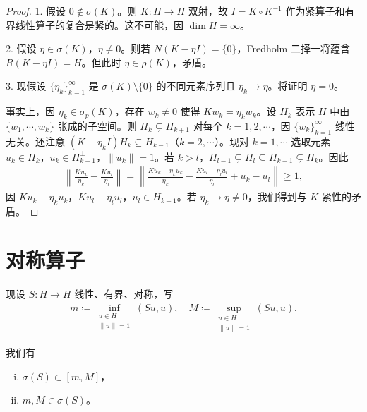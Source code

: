 \documentclass[../main.tex]{subfiles}
\begin{document}
\begin{proof}
1. 假设 $0\notin\sigma(K)$。则 $K:H\to H$ 双射，故 $I=K\circ K^{-1}$ 作为紧算子和有界线性算子的复合是紧的。这不可能，因 $\dim H=\infty$。

2. 假设 $\eta\in\sigma(K)$，$\eta\neq 0$。则若 $N(K-\eta I)=\{0\}$，Fredholm 二择一将蕴含 $R(K-\eta I)=H$。但此时 $\eta\in\rho(K)$，矛盾。

3. 现假设 $\{\eta_k\}_{k=1}^\infty$ 是 $\sigma(K)\setminus\{0\}$ 的不同元素序列且 $\eta_k\to\eta$。将证明 $\eta=0$。

事实上，因 $\eta_k\in\sigma_p(K)$，存在 $w_k\neq 0$ 使得 $Kw_k=\eta_kw_k$。设 $H_k$ 表示 $H$ 中由 $\{w_1,\cdots,w_k\}$ 张成的子空间。则 $H_k\subsetneq H_{k+1}$ 对每个 $k=1,2,\cdots$，因 $\{w_k\}_{k=1}^\infty$ 线性无关。还注意 $(K-\eta_kI)H_k\subseteq H_{k-1}$（$k=2,\cdots$）。现对 $k=1,\cdots$ 选取元素 $u_k\in H_k$，$u_k\in H_{k-1}^\perp$，$\|u_k\|=1$。若 $k>l$，$H_{l-1}\subsetneq H_l\subseteq H_{k-1}\subsetneq H_k$。因此
\begin{align*}
\left\|\frac{Ku_k}{\eta_k}-\frac{Ku_l}{\eta_l}\right\|=\left\|\frac{Ku_k-\eta_ku_k}{\eta_k}-\frac{Ku_l-\eta_lu_l}{\eta_l}+u_k-u_l\right\|\geqslant 1,
\end{align*}
因 $Ku_k-\eta_ku_k$，$Ku_l-\eta_lu_l$，$u_l\in H_{k-1}$。若 $\eta_k\to\eta\neq 0$，我们得到与 $K$ 紧性的矛盾。
\end{proof}

\section{对称算子}\label{section:appD-对称算子}

现设 $S:H\to H$ 线性、有界、对称，写
\begin{align*}
m\coloneqq\inf_{\substack{u\in H\\\|u\|=1}}(Su,u),\quad M\coloneqq\sup_{\substack{u\in H\\\|u\|=1}}(Su,u).
\end{align*}

\begin{lemma}[谱的界。]\label{lemma:appD-谱界}我们有
\begin{enumerate}[(i)]
\item $\sigma(S)\subset[m,M]$，
\item $m,M\in\sigma(S)$。
\end{enumerate}
\end{lemma}
\end{document}
